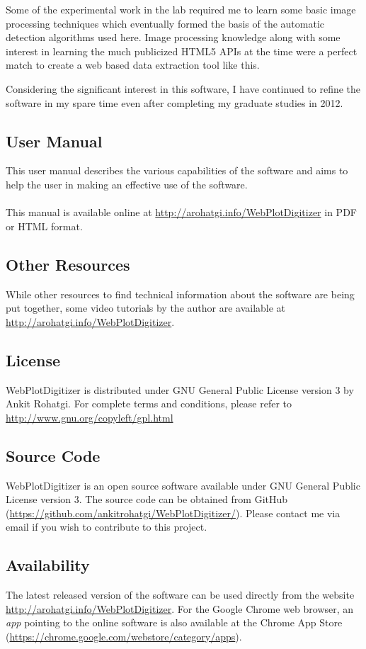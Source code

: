 \documentclass[letterpaper, 10pt]{article}
\begin{document}
Some of the experimental work in the lab required me to learn some basic image processing techniques which eventually formed the basis of the automatic detection algorithms used here. Image processing knowledge along with some interest in learning the much publicized HTML5 APIs at the time were a perfect match to create a web based data extraction tool like this.

Considering the significant interest in this software, I have continued to refine the software in my spare time even after completing my graduate studies in 2012.
\subsection{User Manual}
This user manual describes the various capabilities of the software and aims to help the user in making an effective use of the software. 
\\
\\
This manual is available online at \url{http://arohatgi.info/WebPlotDigitizer} in PDF or HTML format.

\subsection{Other Resources}
While other resources to find technical information about the software are being put together, some video tutorials by the author are available at \url{http://arohatgi.info/WebPlotDigitizer}.

\subsection{License}
WebPlotDigitizer is distributed under GNU General Public License version 3 by Ankit Rohatgi. For complete terms and conditions, please refer to \url{http://www.gnu.org/copyleft/gpl.html}
\subsection{Source Code}
WebPlotDigitizer is an open source software available under GNU General Public License version 3. The source code can be obtained from GitHub (\url{https://github.com/ankitrohatgi/WebPlotDigitizer/}). Please contact me via email if you wish to contribute to this project.

\subsection{Availability}
The latest released version of the software can be used directly from the website \url{http://arohatgi.info/WebPlotDigitizer}. For the Google Chrome web browser, an \emph{app} pointing to the online software is also available at the Chrome App Store (\url{https://chrome.google.com/webstore/category/apps}).
\end{document}
